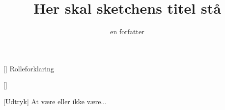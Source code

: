 \documentclass[a4paper,11pt]{article}
\title{Her skal sketchens titel stå}
\author{en forfatter}
\begin{document}
\maketitle

\begin{roles}
[] Rolleforklaring
\end{roles}

\begin{props}
[]
\end{props}


\begin{sketch}


[Udtryk] At være eller ikke være... 



\end{sketch}
\end{document}
